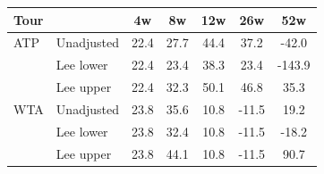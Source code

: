 \begin{tabular}{ll*{5}{c}}
\toprule
Tour & & 4w & 8w & 12w & 26w & 52w \\
\midrule
ATP & Unadjusted & 22.4 & 27.7 & 44.4 & 37.2 & -42.0 \\
 & Lee lower & 22.4 & 23.4 & 38.3 & 23.4 & -143.9 \\
 & Lee upper & 22.4 & 32.3 & 50.1 & 46.8 & 35.3 \\[0.3em]
WTA & Unadjusted & 23.8 & 35.6 & 10.8 & -11.5 & 19.2 \\
 & Lee lower & 23.8 & 32.4 & 10.8 & -11.5 & -18.2 \\
 & Lee upper & 23.8 & 44.1 & 10.8 & -11.5 & 90.7 \\[0.3em]
\bottomrule
\end{tabular}
